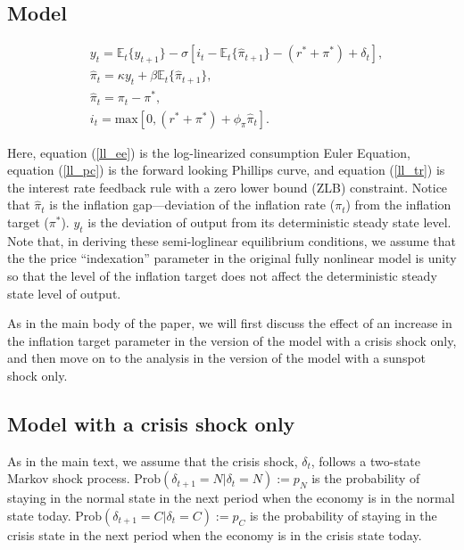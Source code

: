 \documentclass[11pt]{article}
\begin{document}
\begin{singlespace}
		\subsection{Model}
		
		\begin{align}
			& y_{t} = \mathbb{E}_t\{y_{t+1}\}  -\sigma \left[i_t - \mathbb{E}_t\{\hat{\pi}_{t+1}\} - (r^* + \pi^*) + \delta_t \right],\label{ll_ee}\\
			& \hat{\pi}_{t} = \kappa y_t + \beta\mathbb{E}_t\{\hat{\pi}_{t+1}\}\label{ll_pc},\\
			& \hat{\pi}_{t} = \pi_t - \pi^*,\\
			& i_t = \text{max}\left[0, (r^* + \pi^*) +  \phi_{\pi}\hat{\pi}_{t}\right].\label{ll_tr}
		\end{align}
		
		\noindent Here, equation (\ref{ll_ee}) is the log-linearized consumption Euler Equation, equation (\ref{ll_pc}) is the forward looking Phillips curve, and  equation (\ref{ll_tr}) is the interest rate feedback rule with a zero lower bound (ZLB) constraint. Notice that $\hat{\pi}_{t}$ is the inflation gap---deviation of the inflation rate ($\pi_{t}$) from the inflation target ($\pi^*$). $y_{t}$ is the deviation of output from its deterministic steady state level. Note that, in deriving these semi-loglinear equilibrium conditions, we assume that the the price ``indexation'' parameter in the original fully nonlinear model is unity so that the level of the inflation target does not affect the deterministic steady state level of output. 
		
		As in the main body of the paper, we will first discuss the effect of an increase in the inflation target parameter in the version of the model with a crisis shock only, and then move on to the analysis in the version of the model with a sunspot shock only. 
		
		\subsection{Model with a crisis shock only}
		
		As in the main text, we assume that the crisis shock, $\delta_{t}$, follows a two-state Markov shock process. $ \text{Prob}(\delta_{t+1}=N|\delta_{t}=N):= p_{N}$ is the probability of staying in the normal state in the next period when the economy is in the normal state today. $\text{Prob}(\delta_{t+1}=C|\delta_{t}=C) := p_C$ is the probability of staying in the crisis state in the next period when the economy is in the crisis state today. 
		

\end{singlespace}
\end{document}

